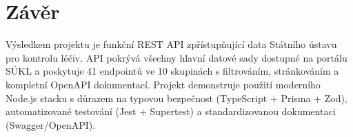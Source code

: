 \documentclass[12pt,a4paper]{article}
\begin{document}
\section{Závěr}

Výsledkem projektu je funkční REST API zpřístupňující data Státního ústavu pro kontrolu léčiv. API pokrývá všechny hlavní datové sady dostupné na portálu SÚKL a poskytuje 41 endpointů ve 10 skupinách s filtrováním, stránkováním a kompletní OpenAPI dokumentací. Projekt demonstruje použití moderního Node.js stacku s důrazem na typovou bezpečnost (TypeScript + Prisma + Zod), automatizované testování (Jest + Supertest) a standardizovanou dokumentaci (Swagger/OpenAPI).
\end{document}
